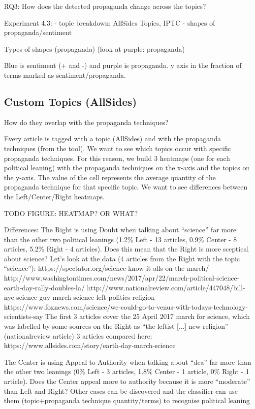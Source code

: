 RQ3: How does the detected propaganda change across the topics?

Experiment 4.3: 
- topic breakdown: AllSides Topics, IPTC
- shapes of propaganda/sentiment 


Types of shapes (propaganda)
(look at purple: propaganda)

Blue is sentiment (+ and -) and purple is propaganda. 
y axis in the fraction of terms marked as sentiment/propaganda.

\subsection{Custom Topics (AllSides)}

How do they overlap with the propaganda techniques?

Every article is tagged with a topic (AllSides) and with the propaganda techniques (from the tool).
We want to see which topics occur with specific propaganda techniques.
For this reason, we build 3 heatmaps (one for each political leaning) with the propaganda techniques on the x-axis and the topics on the y-axis. The value of the cell represents the average quantity of the propaganda technique for that specific topic.
We want to see differences between the Left/Center/Right heatmaps.

TODO FIGURE: HEATMAP? OR WHAT?

Differences:
The Right is using Doubt when talking about “science” far more than the other two political leanings (1.2\% Left - 13 articles, 0.9\% Center - 8 articles, 5.2\% Right - 4 articles). Does this mean that the Right is more sceptical about science? Let’s look at the data (4 articles from the Right with the topic “science”):
https://spectator.org/science-know-it-alls-on-the-march/
http://www.washingtontimes.com/news/2017/apr/22/march-political-science-earth-day-rally-doubles-la/ 
http://www.nationalreview.com/article/447048/bill-nye-science-guy-march-science-left-politics-religion
https://www.foxnews.com/science/we-could-go-to-venus-with-todays-technology-scientists-say 
The first 3 articles cover the 25 April 2017 march for science, which was labelled by some sources on the Right as “the leftist [...] new religion” (nationalreview article)
3 articles compared here: https://www.allsides.com/story/earth-day-march-science 

The Center is using Appeal to Authority when talking about “dea” far more than the other two leanings (0\% Left - 3 articles, 1.8\% Center - 1 article, 0\% Right - 1 article). Does the Center appeal more to authority because it is more “moderate” than Left and Right?
Other cases can be discovered and the classifier can use them (topic+propaganda technique quantity/terms) to recognise political leaning



